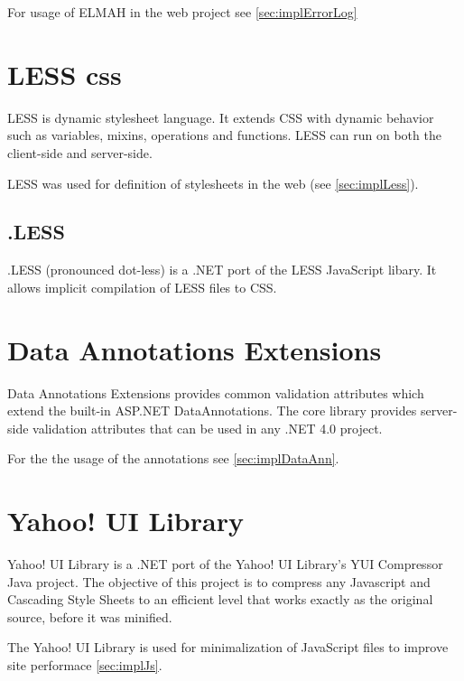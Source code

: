 For usage of ELMAH in the web project see \autoref{sec:implErrorLog}

 
\section{LESS css}
\label{sec:lesscss}

\noindent
LESS is dynamic stylesheet language.
It extends CSS with dynamic behavior such as variables, mixins, operations and functions.
LESS can run on both the client-side and server-side.

LESS was used for definition of stylesheets in the web (see \autoref{sec:implLess}).

\subsection{.LESS}

\noindent
.LESS (pronounced dot-less) is a .NET port of the LESS JavaScript libary.
It allows implicit compilation of LESS files to CSS.


\section{Data Annotations Extensions}
\label{sec:dataAnnoExt}

\noindent
Data Annotations Extensions provides common validation attributes which extend the built-in ASP.NET DataAnnotations. 
The core library provides server-side validation attributes that can be used in any .NET 4.0 project.

For the the usage of the annotations see \autoref{sec:implDataAnn}.



\section{Yahoo! UI Library}
\label{sec:yuiLib}

\noindent
Yahoo! UI Library is a .NET port of the Yahoo! UI Library's YUI Compressor Java project.
The objective of this project is to compress any Javascript and Cascading Style Sheets to an efficient level that works exactly as the original source, before it was minified.

The Yahoo! UI Library is used for minimalization of JavaScript files to improve site performace \autoref{sec:implJs}. 


